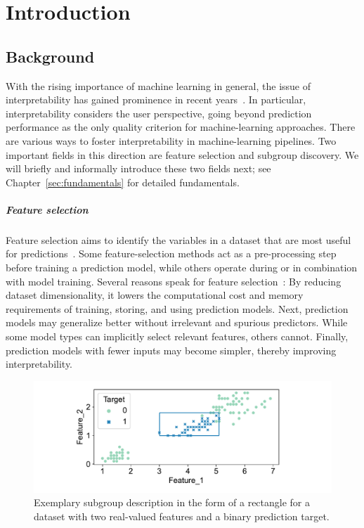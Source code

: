 \chapter{Introduction}
\label{sec:introduction}

\section{Background}
\label{sec:introduction:background}

With the rising importance of machine learning in general, the issue of interpretability has gained prominence in recent years~\cite{carvalho2019machine, gilpin2018explaining, molnar2020interpretable}.
In particular, interpretability considers the user perspective, going beyond prediction performance as the only quality criterion for machine-learning approaches.
There are various ways to foster interpretability in machine-learning pipelines.
Two important fields in this direction are feature selection and subgroup discovery.
We will briefly and informally introduce these two fields next; see Chapter~\ref{sec:fundamentals} for detailed fundamentals.

\paragraph{Feature selection}

Feature selection aims to identify the variables in a dataset that are most useful for predictions~\cite{guyon2003introduction}.
Some feature-selection methods act as a pre-processing step before training a prediction model, while others operate during or in combination with model training.
Several reasons speak for feature selection~\cite{chandrashekar2014survey, li2017feature}:
By reducing dataset dimensionality, it lowers the computational cost and memory requirements of training, storing, and using prediction models.
Next, prediction models may generalize better without irrelevant and spurious predictors.
While some model types can implicitly select relevant features, others cannot.
Finally, prediction models with fewer inputs may become simpler, thereby improving interpretability.

\begin{figure}[t]
	\centering
	\includegraphics[width=\textwidth, trim=15 15 15 15, clip]{plots/csd-exemplary-subgroup.pdf}
	\caption{
		Exemplary subgroup description in the form of a rectangle for a dataset with two real-valued features and a binary prediction target.
	}
	\label{fig:csd:exemplary-subgroup}
\end{figure}

